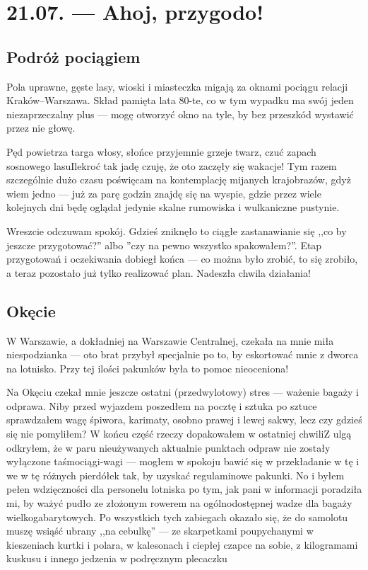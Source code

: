 \chapter*{21.07. --- Ahoj, przygodo!}

\section*{Podróż pociągiem}

Pola uprawne, gęste lasy, wioski i miasteczka migają za oknami pociągu relacji Kraków--Warszawa. Skład pamięta lata 80-te, co w tym wypadku ma swój jeden niezaprzeczalny plus --- mogę otworzyć okno na tyle, by bez przeszkód wystawić przez nie głowę.

Pęd powietrza targa włosy, słońce przyjemnie grzeje twarz, czuć zapach sosnowego lasu\textellipsis Ilekroć tak jadę czuję, że oto zaczęły się wakacje! Tym razem szczególnie dużo czasu poświęcam na kontemplację mijanych krajobrazów, gdyż wiem jedno --- już za parę godzin znajdę się na wyspie, gdzie przez wiele kolejnych dni będę oglądał jedynie skalne rumowiska i wulkaniczne pustynie.

Wreszcie odczuwam spokój. Gdzieś zniknęło to ciągłe zastanawianie się ,,co by jeszcze przygotować?'' albo ''czy na pewno wszystko spakowałem?''. Etap przygotowań i oczekiwania dobiegł końca --- co można było zrobić, to się zrobiło, a teraz pozostało już tylko realizować plan. Nadeszła chwila działania!

\section*{Okęcie}

W Warszawie, a dokładniej na Warszawie Centralnej, czekała na mnie miła niespodzianka --- oto brat przybył specjalnie po to, by eskortować mnie z dworca na lotnisko. Przy tej ilości pakunków była to pomoc nieoceniona!

Na Okęciu czekał mnie jeszcze ostatni (przedwylotowy) stres --- ważenie bagaży i odprawa. Niby przed wyjazdem poszedłem na pocztę i sztuka po sztuce sprawdzałem wagę śpiwora, karimaty, osobno prawej i lewej sakwy, lecz czy gdzieś się nie pomyliłem? W końcu część rzeczy dopakowałem w ostatniej chwili\textellipsis Z ulgą odkryłem, że w paru nieużywanych aktualnie punktach odpraw nie zostały wyłączone taśmociągi-wagi --- mogłem w spokoju bawić się w przekładanie w tę i we w tę różnych pierdółek tak, by uzyskać regulaminowe pakunki. No i byłem pełen wdzięczności dla personelu lotniska po tym, jak pani w informacji poradziła mi, by ważyć pudło ze złożonym rowerem na ogólnodostępnej wadze dla bagaży wielkogabarytowych. Po wszystkich tych zabiegach okazało się, że do samolotu muszę wsiąść ubrany ,,na cebulkę'' --- ze skarpetkami poupychanymi w kieszeniach kurtki i polara, w kalesonach i ciepłej czapce na sobie, z kilogramami kuskusu i innego jedzenia w podręcznym plecaczku\textellipsis

